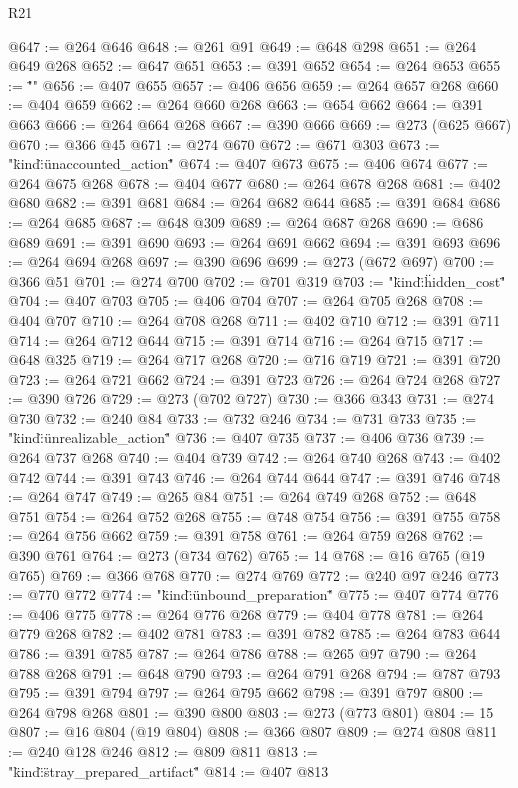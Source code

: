 \begin{lexlean}{R21}
\begin{coremodule}
{{{{{{{{{{@647 := @264 @646
@648 := @261 @91
@649 := @648 @298
@651 := @264 @649 @268
@652 := @647 @651
@653 := @391 @652
@654 := @264 @653
@655 := "\"}"
@656 := @407 @655
@657 := @406 @656
@659 := @264 @657 @268
@660 := @404 @659
@662 := @264 @660 @268
@663 := @654 @662
@664 := @391 @663
@666 := @264 @664 @268
@667 := @390 @666
@669 := @273 (@625 @667)
@670 := @366 @45
@671 := @274 @670
@672 := @671 @303
@673 := "{\"kind\":\"unaccounted_action\""
@674 := @407 @673
@675 := @406 @674
@677 := @264 @675 @268
@678 := @404 @677
@680 := @264 @678 @268
@681 := @402 @680
@682 := @391 @681
@684 := @264 @682 @644
@685 := @391 @684
@686 := @264 @685
@687 := @648 @309
@689 := @264 @687 @268
@690 := @686 @689
@691 := @391 @690
@693 := @264 @691 @662
@694 := @391 @693
@696 := @264 @694 @268
@697 := @390 @696
@699 := @273 (@672 @697)
@700 := @366 @51
@701 := @274 @700
@702 := @701 @319
@703 := "{\"kind\":\"hidden_cost\""
@704 := @407 @703
@705 := @406 @704
@707 := @264 @705 @268
@708 := @404 @707
@710 := @264 @708 @268
@711 := @402 @710
@712 := @391 @711
@714 := @264 @712 @644
@715 := @391 @714
@716 := @264 @715
@717 := @648 @325
@719 := @264 @717 @268
@720 := @716 @719
@721 := @391 @720
@723 := @264 @721 @662
@724 := @391 @723
@726 := @264 @724 @268
@727 := @390 @726
@729 := @273 (@702 @727)
@730 := @366 @343
@731 := @274 @730
@732 := @240 @84
@733 := @732 @246
@734 := @731 @733
@735 := "{\"kind\":\"unrealizable_action\""
@736 := @407 @735
@737 := @406 @736
@739 := @264 @737 @268
@740 := @404 @739
@742 := @264 @740 @268
@743 := @402 @742
@744 := @391 @743
@746 := @264 @744 @644
@747 := @391 @746
@748 := @264 @747
@749 := @265 @84
@751 := @264 @749 @268
@752 := @648 @751
@754 := @264 @752 @268
@755 := @748 @754
@756 := @391 @755
@758 := @264 @756 @662
@759 := @391 @758
@761 := @264 @759 @268
@762 := @390 @761
@764 := @273 (@734 @762)
@765 := 14
@768 := @16 @765 (@19 @765)
@769 := @366 @768
@770 := @274 @769
@772 := @240 @97 @246
@773 := @770 @772
@774 := "{\"kind\":\"unbound_preparation\""
@775 := @407 @774
@776 := @406 @775
@778 := @264 @776 @268
@779 := @404 @778
@781 := @264 @779 @268
@782 := @402 @781
@783 := @391 @782
@785 := @264 @783 @644
@786 := @391 @785
@787 := @264 @786
@788 := @265 @97
@790 := @264 @788 @268
@791 := @648 @790
@793 := @264 @791 @268
@794 := @787 @793
@795 := @391 @794
@797 := @264 @795 @662
@798 := @391 @797
@800 := @264 @798 @268
@801 := @390 @800
@803 := @273 (@773 @801)
@804 := 15
@807 := @16 @804 (@19 @804)
@808 := @366 @807
@809 := @274 @808
@811 := @240 @128 @246
@812 := @809 @811
@813 := "{\"kind\":\"stray_prepared_artifact\""
@814 := @407 @813
}}}}}}}}}}}}}}
\end{coremodule}
\end{lexlean}
